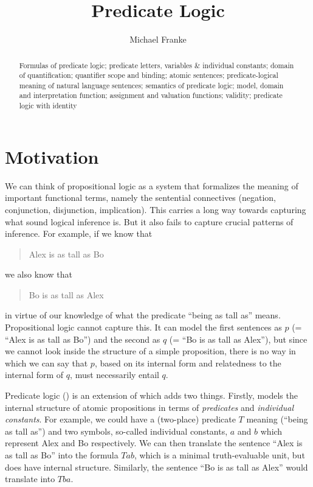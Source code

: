 \documentclass[nobib,nofonts]{tufte-handout}
\title{Predicate Logic}
\author[M.~Franke]{Michael Franke}
\date{} %
\newcommand{\proplog}{\acro{PropLog}}
\newcommand{\predlog}{\acro{PredLog}}
\begin{document}
\maketitle

\begin{abstract}
\noindent
Formulas of predicate logic;
predicate letters, variables \& individual constants;
domain of quantification;
quantifier scope and binding;
atomic sentences;
predicate-logical meaning of natural language sentences;
semantics of predicate logic;
model, domain and interpretation function;
assignment and valuation functions;
validity;
predicate logic with identity
\end{abstract}

\section{Motivation}

We can think of propositional logic as a system that formalizes the meaning of important functional terms, namely the sentential connectives (negation, conjunction, disjunction, implication).
This carries a long way towards capturing what sound logical inference is.
But it also fails to capture crucial patterns of inference.
For example, if we know that
\begin{quote}
  Alex is as tall as Bo
\end{quote}
we also know that
\begin{quote}
  Bo is as tall as Alex
\end{quote}
in virtue of our knowledge of what the predicate ``being as tall as'' means.
Propositional logic cannot capture this.
It can model the first sentences as $p$ (= ``Alex is as tall as Bo'') and the second as $q$ (= ``Bo is as tall as Alex''), but since we cannot look inside the structure of a simple proposition, there is no way in which we can say that $p$, based on its internal form and relatedness to the internal form of $q$, must necessarily entail $q$.

Predicate logic (\predlog) is an extension of \proplog which adds two things.
Firstly, \predlog models the internal structure of atomic propositions in terms of \emph{predicates} and \emph{individual constants}.
For example, we could have a (two-place) predicate $T$ meaning (``being as tall as'') and two symbols, so-called individual constants, $a$ and $b$ which represent Alex and Bo respectively.
We can then translate the sentence ``Alex is as tall as Bo'' into the formula $Tab$, which is a minimal truth-evaluable unit, but does have internal structure.
Similarly, the sentence ``Bo is as tall as Alex'' would translate into $Tba$.
\end{document}
